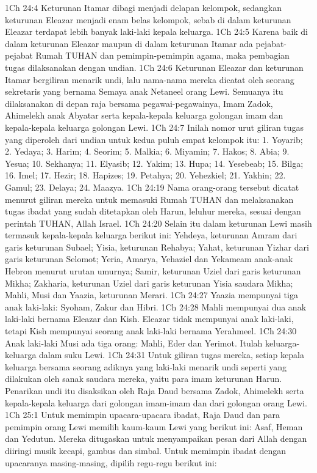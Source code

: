 1Ch 24:4  Keturunan Itamar dibagi menjadi delapan kelompok, sedangkan keturunan Eleazar menjadi enam belas kelompok, sebab di dalam keturunan Eleazar terdapat lebih banyak laki-laki kepala keluarga.
1Ch 24:5  Karena baik di dalam keturunan Eleazar maupun di dalam keturunan Itamar ada pejabat-pejabat Rumah TUHAN dan pemimpin-pemimpin agama, maka pembagian tugas dilaksanakan dengan undian.
1Ch 24:6  Keturunan Eleazar dan keturunan Itamar bergiliran menarik undi, lalu nama-nama mereka dicatat oleh seorang sekretaris yang bernama Semaya anak Netaneel orang Lewi. Semuanya itu dilaksanakan di depan raja bersama pegawai-pegawainya, Imam Zadok, Ahimelekh anak Abyatar serta kepala-kepala keluarga golongan imam dan kepala-kepala keluarga golongan Lewi.
1Ch 24:7  Inilah nomor urut giliran tugas yang diperoleh dari undian untuk kedua puluh empat kelompok itu: 1. Yoyarib; 2. Yedaya; 3. Harim; 4. Seorim; 5. Malkia; 6. Miyamin; 7. Hakos; 8. Abia; 9. Yesua; 10. Sekhanya; 11. Elyasib; 12. Yakim; 13. Hupa; 14. Yesebeab; 15. Bilga; 16. Imel; 17. Hezir; 18. Hapizes; 19. Petahya; 20. Yehezkiel; 21. Yakhin; 22. Gamul; 23. Delaya; 24. Maazya.
1Ch 24:19  Nama orang-orang tersebut dicatat menurut giliran mereka untuk memasuki Rumah TUHAN dan melaksanakan tugas ibadat yang sudah ditetapkan oleh Harun, leluhur mereka, sesuai dengan perintah TUHAN, Allah Israel.
1Ch 24:20  Selain itu dalam keturunan Lewi masih termasuk kepala-kepala keluarga berikut ini: Yehdeya, keturunan Amram dari garis keturunan Subael; Yisia, keturunan Rehabya; Yahat, keturunan Yizhar dari garis keturunan Selomot; Yeria, Amarya, Yehaziel dan Yekameam anak-anak Hebron menurut urutan umurnya; Samir, keturunan Uziel dari garis keturunan Mikha; Zakharia, keturunan Uziel dari garis keturunan Yisia saudara Mikha; Mahli, Musi dan Yaazia, keturunan Merari.
1Ch 24:27  Yaazia mempunyai tiga anak laki-laki: Syoham, Zakur dan Hibri.
1Ch 24:28  Mahli mempunyai dua anak laki-laki bernama Eleazar dan Kish. Eleazar tidak mempunyai anak laki-laki, tetapi Kish mempunyai seorang anak laki-laki bernama Yerahmeel.
1Ch 24:30  Anak laki-laki Musi ada tiga orang: Mahli, Eder dan Yerimot. Itulah keluarga-keluarga dalam suku Lewi.
1Ch 24:31  Untuk giliran tugas mereka, setiap kepala keluarga bersama seorang adiknya yang laki-laki menarik undi seperti yang dilakukan oleh sanak saudara mereka, yaitu para imam keturunan Harun. Penarikan undi itu disaksikan oleh Raja Daud bersama Zadok, Ahimelekh serta kepala-kepala keluarga dari golongan imam-imam dan dari golongan orang Lewi.
1Ch 25:1  Untuk memimpin upacara-upacara ibadat, Raja Daud dan para pemimpin orang Lewi memilih kaum-kaum Lewi yang berikut ini: Asaf, Heman dan Yedutun. Mereka ditugaskan untuk menyampaikan pesan dari Allah dengan diiringi musik kecapi, gambus dan simbal. Untuk memimpin ibadat dengan upacaranya masing-masing, dipilih regu-regu berikut ini:
